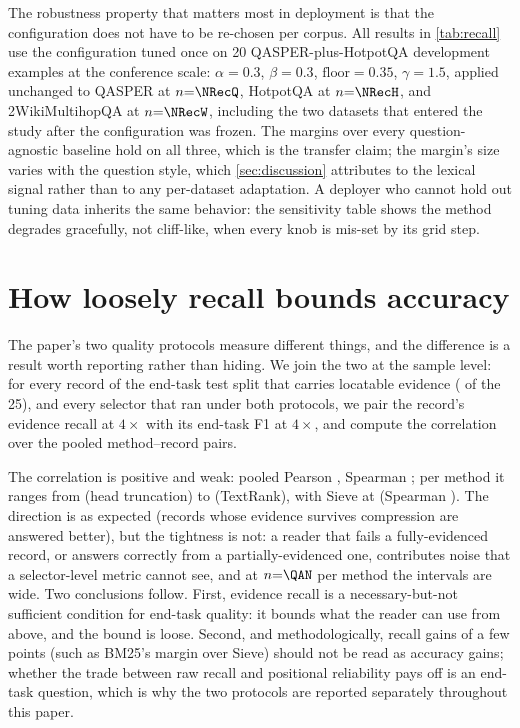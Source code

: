 \documentclass[preprint,12pt]{elsarticle}
\theoremstyle{remark}
\newcommand{\method}{Sieve}
\begin{document}
The robustness property that matters most in deployment is that the
configuration does not have to be re-chosen per corpus. All results in
\autoref{tab:recall} use the configuration tuned once on 20
QASPER-plus-HotpotQA development examples at the conference scale:
$\alpha=0.3$, $\beta=0.3$, $\mathrm{floor}=0.35$, $\gamma=1.5$,
applied unchanged to QASPER at $n{=}\NRecQ$, HotpotQA at
$n{=}\NRecH$, and 2WikiMultihopQA at $n{=}\NRecW$, including the two
datasets that entered the study after the configuration was frozen.
The margins over every question-agnostic baseline hold on all three,
which is the transfer claim; the margin's size varies with the
question style, which \autoref{sec:discussion} attributes to the
lexical signal rather than to any per-dataset adaptation. A deployer
who cannot hold out tuning data inherits the same behavior: the
sensitivity table shows the method degrades gracefully, not
cliff-like, when every knob is mis-set by its grid step.

\section{How loosely recall bounds accuracy}
\label{sec:corr}
The paper's two quality protocols measure different things, and the
difference is a result worth reporting rather than hiding. We join the
two at the sample level: for every record of the end-task test split
that carries locatable evidence (\CorrNRecs{} of the 25), and every
selector that ran under both protocols, we pair the record's evidence
recall at $4\times$ with its end-task F1 at $4\times$, and compute
the correlation over the pooled \CorrNPairs{} method--record pairs.

The correlation is positive and weak: pooled Pearson
\CorrPearson{}, Spearman \CorrSpearman{}; per method it ranges from
\CorrHeaPearson{} (head truncation) to \CorrTRPearson{} (TextRank),
with \method{} at \CorrSiePearson{} (Spearman \CorrSieSpearman{}).
The direction is as expected (records whose evidence survives
compression are answered better), but the tightness is not: a
reader that fails a fully-evidenced record, or answers correctly from
a partially-evidenced one, contributes noise that a selector-level
metric cannot see, and at $n{=}\QAN$ per method the intervals are wide.
Two conclusions follow. First, evidence recall is a necessary-but-not
sufficient condition for end-task quality: it bounds what the reader
can use from above, and the bound is loose. Second, and methodologically,
recall gains of a few points (such as BM25's margin over \method{})
should not be read as accuracy gains; whether the trade between
raw recall and positional reliability pays off is an end-task
question, which is why the two protocols are reported separately
throughout this paper.
\end{document}
